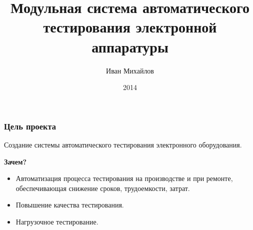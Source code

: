 \documentclass{beamer}
\title[Магистерский проект]{Модульная система автоматического тестирования электронной аппаратуры} %
\author{Иван Михайлов} %
\institute[СПбНИУ ИТМО] %
{
Санкт-Петербургский национальный исследовательский университет информационных технологий, механики и оптики
}
\date{2014} %
\begin{document}
\begin{frame}
\titlepage %
\end{frame}





\begin{frame}
\frametitle{Цель проекта}
Создание системы автоматического тестирования электронного оборудования.

\vspace{20pt}
\textbf{Зачем?}
\begin{itemize}
\item Автоматизация процесса тестирования на производстве и при ремонте, обеспечивающая снижение сроков, трудоемкости, затрат.
\item Повышение качества тестирования.
\item Нагрузочное тестирование.
\end{itemize}
\end{frame}
\end{document}

